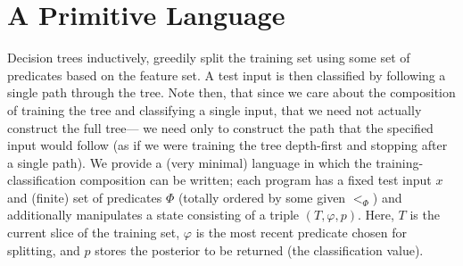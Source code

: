 \section{A Primitive Language}\label{sec:dsl}

Decision trees inductively, greedily split the training set
using some set of predicates based on the feature set.
A test input is then classified by following a single path through the tree.
Note then, that since we care about the composition of training the tree
and classifying a single input,
that we need not actually construct the full tree---%
we need only to construct the path that the specified input would follow
(as if we were training the tree depth-first and stopping after a single path).
We provide a (very minimal) language in which the training-classification
composition can be written;
each program has a fixed test input $x$ and (finite) set of predicates $\Phi$
(totally ordered by some given $<_\Phi$)
and additionally manipulates a state consisting of a triple $(T, \varphi, p)$.
Here, $T$ is the current slice of the training set,
$\varphi$ is the most recent predicate chosen for splitting,
and $p$ stores the posterior to be returned (the classification value).

